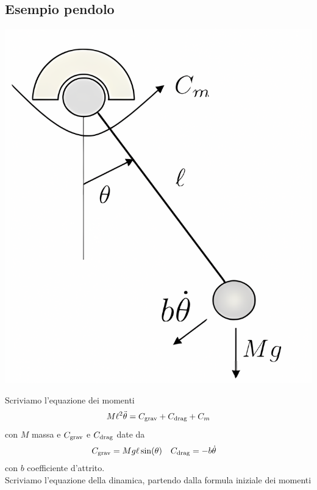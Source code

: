 \documentclass{article}
\numberwithin{equation}{subsection}
\let\oldsubsection\subsection%
\renewcommand{\subsection}{%
  \renewcommand{\theequation}{\thesubsection.\arabic{equation}}%
  \oldsubsection}%
\begin{document}
\subsection{Esempio pendolo}
\begin{center}
    \includegraphics[scale=0.17]{Images/Es_pendolo.png}
\end{center}
Scriviamo l'equazione dei momenti
\begin{equation}
    M \ell^2 \ddot \theta= C_{\text{grav}} + C_{\text{drag}} + C_m
\end{equation}
con $M$ massa e $C_{\text{grav}}$ e $C_{\text{drag}}$ date da
\begin{align*}
    C_{\text{grav}} &=M g \ell \sin(\theta) &
    C_{\text{drag}} &= -b \dot \theta
\end{align*}
con $b$ coefficiente d'attrito.
\vspace*{0.2cm}\\
Scriviamo l'equazione della dinamica, partendo dalla formula iniziale dei momenti
\end{document}
